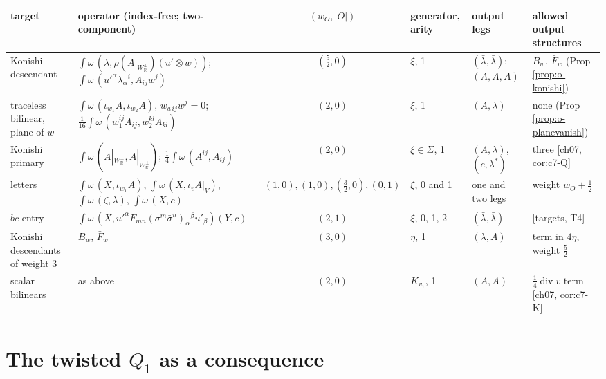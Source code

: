 \begin{tabular}{l|l|c|l|l|l}
target & operator (index-free; two-component) & $(w_O,|O|)$ & generator, arity & output legs & allowed output structures \\
\hline
Konishi descendant & $\int\omega\,(\lambda,\rho(A|_{W_{\mathbb R}^\perp})(u'\otimes w))$; $\int\omega\,(u'^\alpha\lambda_\alpha{}^i,A_{ij}w^j)$ & $(\tfrac52,0)$ & $\xi$, 1 & $(\bar\lambda,\bar\lambda)$; $(A,A,A)$ & $B_w$, $\bar F_w$ (Prop \ref{prop:o-konishi}) \\
traceless bilinear, plane of $w$ & $\int\omega\,(\iota_{w_1}A,\iota_{w_2}A)$, $w_{a\,ij}w^j=0$; $\tfrac1{16}\int\omega\,(w_1^{ij}A_{ij},w_2^{kl}A_{kl})$ & $(2,0)$ & $\xi$, 1 & $(A,\lambda)$ & none (Prop \ref{prop:o-planevanish}) \\
Konishi primary & $\int\omega\,(A|_{W_{\mathbb R}^\perp},A|_{W_{\mathbb R}^\perp})$; $\tfrac14\int\omega\,(A^{ij},A_{ij})$ & $(2,0)$ & $\xi\in\Sigma$, 1 & $(A,\lambda)$, $(c,\lambda^*)$ & three [ch07, cor:c7-Q] \\
letters & $\int\omega\,(X,\iota_{w_1}A)$, $\int\omega\,(X,\iota_vA|_V)$, $\int\omega\,(\zeta,\lambda)$, $\int\omega\,(X,c)$ & $(1,0),(1,0),(\tfrac32,0),(0,1)$ & $\xi$, 0 and 1 & one and two legs & weight $w_O+\tfrac12$ \\
$bc$ entry & $\int\omega\,(X,u'^\alpha F_{mn}(\sigma^m\bar\sigma^n)_\alpha{}^\beta u'_\beta)(Y,c)$ & $(2,1)$ & $\xi$, 0, 1, 2 & $(\bar\lambda,\bar\lambda)$ & [targets, T4] \\
Konishi descendants of weight 3 & $B_w$, $\bar F_w$ & $(3,0)$ & $\eta$, 1 & $(\lambda,A)$ & term in $4\eta$, weight $\tfrac52$ \\
scalar bilinears & as above & $(2,0)$ & $K_{v_1}$, 1 & $(A,A)$ & $\tfrac14\operatorname{div}v$ term [ch07, cor:c7-K] \\
\end{tabular}

\section{The twisted $Q_1$ as a consequence}

